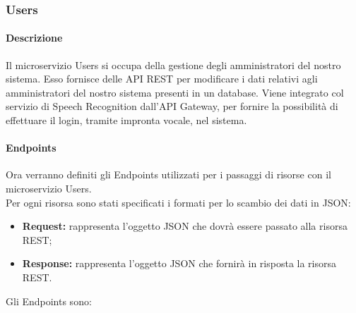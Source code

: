 \subsubsection{Users}
\paragraph{Descrizione}
Il microservizio Users si occupa della gestione degli amministratori del nostro sistema. Esso fornisce delle API REST per modificare i dati relativi agli amministratori del nostro sistema presenti in un database. Viene integrato col servizio di Speech Recognition dall'API Gateway, per fornire la possibilità di effettuare il login, tramite impronta vocale, nel sistema.
\paragraph{Endpoints}

Ora verranno definiti gli Endpoints utilizzati per i passaggi di risorse con il microservizio Users. \\
Per ogni risorsa sono stati specificati i formati per lo scambio dei dati in JSON: 
\begin{itemize}
\item \textbf{Request:} rappresenta l’oggetto JSON che dovrà essere passato alla risorsa REST;
\item \textbf{Response:} rappresenta l’oggetto JSON che fornirà in risposta la risorsa REST.
\end{itemize}

Gli Endpoints sono:
 
